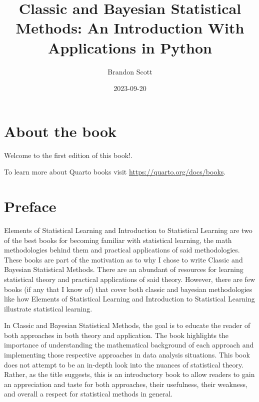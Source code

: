 \documentclass[
  letterpaper,
  DIV=11,
  numbers=noendperiod]{scrreprt}
\title{Classic and Bayesian Statistical Methods: An Introduction With
Applications in Python}
\author{Brandon Scott}
\date{2023-09-20}
\renewcommand*\contentsname{Table of contents}
\newcommand\contentsname{Table of contents}
\begin{document}
\maketitle
\ifdefined\Shaded\renewenvironment{Shaded}{\begin{tcolorbox}[breakable, boxrule=0pt, borderline west={3pt}{0pt}{shadecolor}, sharp corners, enhanced, interior hidden, frame hidden]}{\end{tcolorbox}}\fi

\renewcommand*\contentsname{Table of contents}
{
\hypersetup{linkcolor=}
\setcounter{tocdepth}{2}
\tableofcontents
}

\hypertarget{about-the-book}{%
\chapter*{About the book}\label{about-the-book}}


Welcome to the first edition of this book!.

To learn more about Quarto books visit
\url{https://quarto.org/docs/books}.


\hypertarget{preface}{%
\chapter*{Preface}\label{preface}}


Elements of Statistical Learning and Introduction to Statistical
Learning are two of the best books for becoming familiar with
statistical learning, the math methodologies behind them and practical
applications of said methodologies. These books are part of the
motivation as to why I chose to write Classic and Bayesian Statistical
Methods. There are an abundant of resources for learning statistical
theory and practical applications of said theory. However, there are few
books (if any that I know of) that cover both classic and bayesian
methodologies like how Elements of Statistical Learning and Introduction
to Statistical Learning illustrate statistical learning.

In Classic and Bayesian Statistical Methods, the goal is to educate the
reader of both approaches in both theory and application. The book
highlights the importance of understanding the mathematical background
of each approach and implementing those respective approaches in data
analysis situations. This book does not attempt to be an in-depth look
into the nuances of statistical theory. Rather, as the title suggests,
this is an introductory book to allow readers to gain an appreciation
and taste for both approaches, their usefulness, their weakness, and
overall a respect for statistical methods in general.
\end{document}
